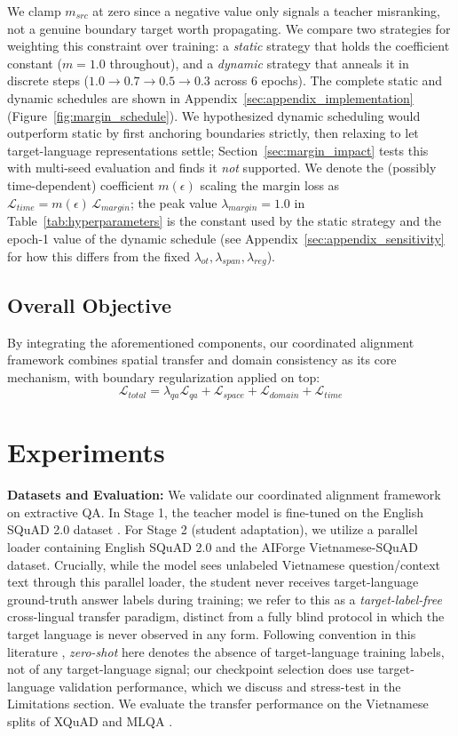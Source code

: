 \documentclass[11pt]{article}
\begin{document}
We clamp $m_{src}$ at zero since a negative value only signals a teacher
misranking, not a genuine boundary target worth propagating. We compare two strategies for weighting this constraint over training: a \emph{static} strategy that holds the coefficient constant ($m=1.0$ throughout), and a \emph{dynamic} strategy that anneals it in discrete steps ($1.0 \rightarrow 0.7 \rightarrow 0.5 \rightarrow 0.3$ across 6 epochs). The complete static and dynamic schedules are shown in Appendix~\ref{sec:appendix_implementation} (Figure~\ref{fig:margin_schedule}). We hypothesized dynamic scheduling would outperform static by first anchoring boundaries strictly, then relaxing to let target-language representations settle; Section~\ref{sec:margin_impact} tests this with multi-seed evaluation and finds it \emph{not} supported. We denote the (possibly time-dependent) coefficient $m(\epsilon)$ scaling the margin loss as $\mathcal{L}_{time} = m(\epsilon)\,\mathcal{L}_{margin}$; the peak value $\lambda_{margin}=1.0$ in Table~\ref{tab:hyperparameters} is the constant used by the static strategy and the epoch-1 value of the dynamic schedule (see Appendix~\ref{sec:appendix_sensitivity} for how this differs from the fixed $\lambda_{ot}, \lambda_{span}, \lambda_{reg}$).



\subsection{Overall Objective}
By integrating the aforementioned components, our coordinated alignment framework combines spatial transfer and domain consistency as its core mechanism, with boundary regularization applied on top:
$$ \mathcal{L}_{total} = \lambda_{qa}\mathcal{L}_{qa} + \mathcal{L}_{space} + \mathcal{L}_{domain} + \mathcal{L}_{time} $$

\section{Experiments}
\label{sec:setup}

\textbf{Datasets and Evaluation:} We validate our coordinated alignment framework on extractive QA. In Stage 1, the teacher model is fine-tuned on the English SQuAD 2.0 dataset \citep{rajpurkar-etal-2018-know}. For Stage 2 (student adaptation), we utilize a parallel loader containing English SQuAD 2.0 and the AIForge Vietnamese-SQuAD dataset. Crucially, while the model sees unlabeled Vietnamese question/context text through this parallel loader, the student never receives target-language ground-truth answer labels during training; we refer to this as a \emph{target-label-free} cross-lingual transfer paradigm, distinct from a fully blind protocol in which the target language is never observed in any form. Following convention in this literature \citep{artetxe-etal-2020-cross, pfeiffer-etal-2020-mad}, \emph{zero-shot} here denotes the absence of target-language training labels, not of any target-language signal; our checkpoint selection does use target-language validation performance, which we discuss and stress-test in the Limitations section. We evaluate the transfer performance on the Vietnamese splits of XQuAD \citep{artetxe-etal-2020-cross} and MLQA \citep{lewis-etal-2020-mlqa}. 
\end{document}
